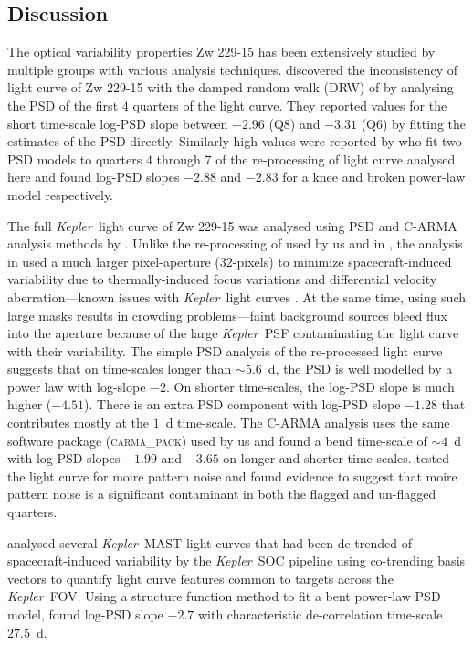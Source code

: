 \documentclass[a4paper,fleqn,usenatbib]{mnras}
\newcommand{\Kepler}{\textit{Kepler~}}
\begin{document}
\subsection[Discussion]{Discussion}\label{sec:Compare}

The optical variability properties Zw 229-15 has been extensively studied by multiple groups with various analysis techniques. \citet{Mushotzky11} discovered the inconsistency of light curve of Zw 229-15 with the damped random walk (DRW) of \citet{Kelly09} by analysing the PSD of the first $4$ quarters of the light curve. They reported values for the short time-scale log-PSD slope between $-2.96$ (Q$8$) and $-3.31$ (Q$6$) by fitting the estimates of the PSD directly. Similarly high values were reported by \citet{Carini12} who fit two PSD models to quarters $4$ through $7$ of the re-processing of light curve analysed here and found log-PSD slopes $-2.88$ and $-2.83$ for a knee and broken power-law model respectively. 

The full \Kepler light curve of Zw 229-15 was analysed using PSD and C-ARMA analysis methods by \citet{Edelson14}. Unlike the re-processing of \citet{CariniWilliamsAAS} used by us and in \citet{Kasliwal15b}, the analysis in \citet{Edelson14} used a much larger pixel-aperture ($32$-pixels) to minimize spacecraft-induced variability due to thermally-induced focus variations and differential velocity aberration---known issues with \Kepler light curves \citep{Kinemuchi12}. At the same time, using such large masks results in crowding problems---faint background sources bleed flux into the aperture because of the large \Kepler PSF contaminating the light curve with their variability. The simple PSD analysis of the re-processed light curve suggests that on time-scales longer than $\sim 5.6$~d, the PSD is well modelled by a power law with log-slope $-2$. On shorter time-scales, the log-PSD slope is much higher ($-4.51$). There is an extra PSD component with log-PSD slope $-1.28$ that contributes mostly at the $1$~d time-scale. The C-ARMA analysis uses the same software package (\textsc{carma\_pack}) used by us and found a bend time-scale of $\sim 4$~d with log-PSD slopes $-1.99$ and $-3.65$ on longer and shorter time-scales. \citet{Edelson14} tested the light curve for moire pattern noise and found evidence to suggest that moire pattern noise is a significant contaminant in both the flagged and un-flagged quarters. 

\citet{Kasliwal15} analysed several \Kepler MAST light curves that had been de-trended of spacecraft-induced variability by the \Kepler SOC pipeline using co-trending basis vectors to quantify light curve features common to targets across the \Kepler FOV. Using a structure function method to fit a bent power-law PSD model, \citet{Kasliwal15} found log-PSD slope $-2.7$ with characteristic de-correlation time-scale $27.5$~d. 
\end{document}
